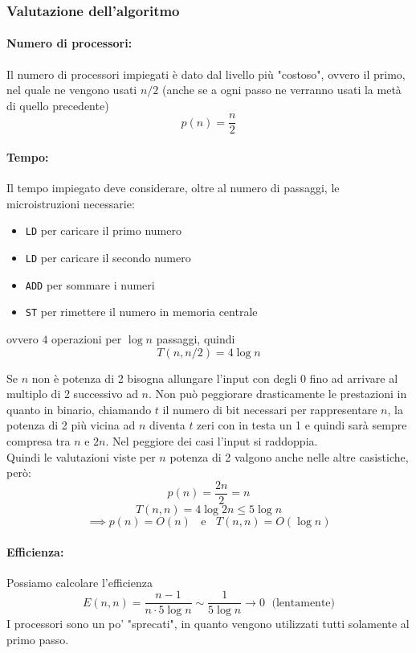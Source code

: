 \documentclass[11pt]{article}
\begin{document}
	\newpage
	
	\subsubsection{Valutazione dell'algoritmo}
	\paragraph{Numero di processori:} Il numero di processori impiegati è dato dal livello più "costoso", ovvero il primo, nel quale ne vengono usati $n/2$ (anche se a ogni passo ne verranno usati la metà di quello precedente)
	$$ p(n) = \frac{n}{2} $$
	
	\paragraph{Tempo:} Il tempo impiegato deve considerare, oltre al numero di passaggi, le microistruzioni necessarie:
	\begin{itemize}
		\item \texttt{LD} per caricare il primo numero
		\item \texttt{LD} per caricare il secondo numero
		\item \texttt{ADD} per sommare i numeri
		\item \texttt{ST} per rimettere il numero in memoria centrale
	\end{itemize}
	ovvero $4$ operazioni per $\log n$ passaggi, quindi
	$$ T(n, n/2) = 4 \log n $$
	
	Se $n$ non è potenza di 2 bisogna allungare l'input con degli $0$ fino ad arrivare al multiplo di 2 successivo ad $n$. Non può peggiorare drasticamente le prestazioni in quanto in binario, chiamando $t$ il numero di bit necessari per rappresentare $n$, la potenza di 2 più vicina ad $n$ diventa $t$ zeri con in testa un 1 e quindi sarà sempre compresa tra $n$ e $2n$. Nel peggiore dei casi l'input si raddoppia. \\
	
	Quindi le valutazioni viste per $n$ potenza di 2 valgono anche nelle altre casistiche, però:
	$$ p(n) = \frac{2n}{2} = n $$
	$$ T(n,n) = 4 \log 2n \leq 5 \log n$$
	$$ \implies p(n) = O(n) \;\;\text{ e } \;\; T(n,n) = O(\log n)$$
	
	\paragraph{Efficienza:} Possiamo calcolare l'efficienza
	$$ E(n,n) = \frac{n-1}{n \cdot 5 \log n} \sim \frac{1}{5 \log n} \rightarrow 0 \;\text{ (lentamente)}$$
	I processori sono un po' "sprecati", in quanto vengono utilizzati tutti solamente al primo passo.\\
	
\end{document}
